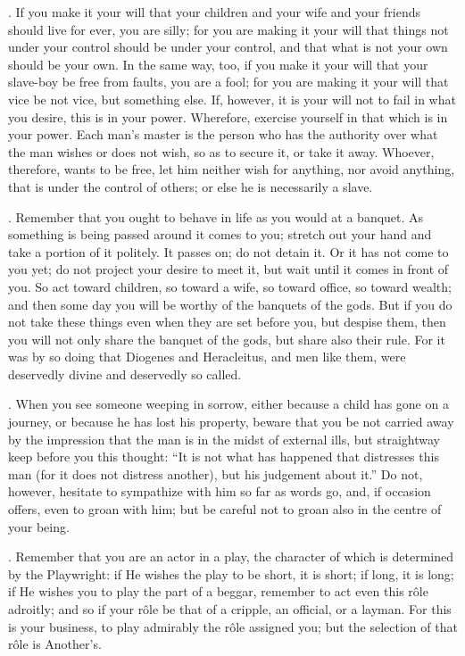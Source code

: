 . If you make it your will that your children and your wife and your friends should live for ever, you are silly; for you are making it your will that things not under your control should be under your control, and that what is not your own should be your own. In the same way, too, if you make it your will that your slave-boy be free from faults, you are a fool; for you are making it your will that vice be not vice, but something else. If, however, it is your will not to fail in what you desire, this is in your power. Wherefore, exercise yourself in that which is in your power. Each man's master is the person who has the authority over what the man wishes or does not wish, so as to secure it, or take it away. Whoever, therefore, wants to be free, let him neither wish for anything, nor avoid anything, that is under the control of others; or else he is necessarily a slave.

. Remember that you ought to behave in life as you would at a banquet. As something is being passed around it comes to you; stretch out your hand and take a portion of it politely. It passes on; do not detain it. Or it has not come to you yet; do not project your desire to meet it, but wait until it comes in front of you. So act toward children, so toward a wife, so toward office, so toward wealth; and then some day you will be worthy of the banquets of the gods. But if you do not take these things even when they are set before you, but despise them, then you will not only share the banquet of the gods, but share also their rule. For it was by so doing that Diogenes and Heracleitus, and men like them, were deservedly divine and deservedly so called.

. When you see someone weeping in sorrow, either because a child has gone on a journey, or because he has lost his property, beware that you be not carried away by the impression that the man is in the midst of external ills, but straightway keep before you this thought: ``It is not what has happened that distresses this man (for it does not distress another), but his judgement about it.'' Do not, however, hesitate to sympathize with him so far as words go, and, if occasion offers, even to groan with him; but be careful not to groan also in the centre of your being.

. Remember that you are an actor in a play, the character of which is determined by the Playwright: if He wishes the play to be short, it is short; if long, it is long; if He wishes you to play the part of a beggar, remember to act even this rôle adroitly; and so if your rôle be that of a cripple, an official, or a layman. For this is your business, to play admirably the rôle assigned you; but the selection of that rôle is Another's.

